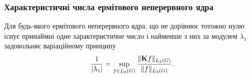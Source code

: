 \subsubsection{Характеристичні числа ермітового неперервного ядра}

\begin{theorem}
    Для будь-якого ермітового неперервного ядра, що не дорівнює тотожно нулю існує принаймні одне характеристичне число і найменше з них за модулем $\lambda_1$ задовольняє варіаційному принципу
    \begin{equation}
        \dfrac{1}{|\lambda_1|} = \displaystyle\sup\limits_{f \in L_2(G)} \dfrac{\|\textbf{K} f\|_{L_2(G)}}{\|f\|_{L_2(G)}}.
    \end{equation}
\end{theorem}

